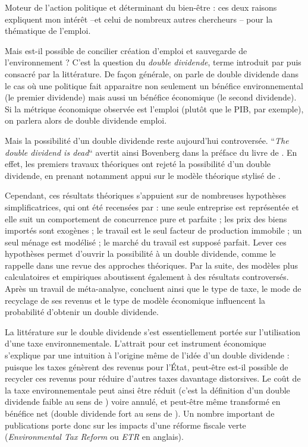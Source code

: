 Moteur de l'action politique et déterminant du bien-être : ces deux raisons expliquent mon intérêt --et celui de nombreux autres chercheurs -- pour la thématique de l'emploi.

Mais est-il possible de concilier création d'emploi et sauvegarde de l'environnement ? C'est la question du \textit{double dividende}, terme introduit par \citet{Pearce1991} puis consacré par la littérature. 
De façon générale, on parle de double dividende dans le cas où une politique fait apparaitre non seulement un bénéfice environnemental (le premier dividende) mais aussi un bénéfice économique (le second dividende). 
Si la métrique économique observée est l'emploi (plutôt que le PIB, par exemple), on parlera alors de double dividende emploi.

Mais la possibilité d'un double dividende reste aujourd'hui controversée. “\textit{The double dividend is dead}“ avertit ainsi Bovenberg dans la préface du livre de \citet{DeMooij2000}. En effet, les premiers travaux théoriques ont rejeté la possibilité d'un double dividende, en prenant notamment appui sur le modèle théorique stylisé de \citet{Bovenberg1994a}. 

Cependant, ces résultats théoriques s'appuient sur de nombreuses hypothèses simplificatrices, qui ont été recensées par \citet{Thubin2012} : une seule entreprise est représentée et elle suit un comportement de concurrence pure et parfaite ; les prix des biens importés sont exogènes ; le travail est le seul facteur de production immobile ; un seul ménage est modélisé ; le marché du travail est supposé parfait. 
Lever ces hypothèses permet d'ouvrir la possibilité à un double dividende, comme le rappelle \citet{Chiroleu-Assouline2001a} dans une revue des approches théoriques. Par la suite, des modèles plus calculatoires et empiriques aboutissent également à des résultats controversés. Après un travail de méta-analyse, \citet{Patuelli2005} concluent ainsi que le type de taxe, le mode de recyclage de ses revenus et le type de modèle économique influencent la probabilité d'obtenir un double dividende.

La littérature sur le double dividende s'est essentiellement portée sur l'utilisation d'une taxe environnementale. L'attrait pour cet instrument économique s'explique par une intuition à l'origine même de l'idée d'un double dividende : puisque les taxes génèrent des revenus pour l'État, peut-être est-il possible de recycler ces revenus pour réduire d'autres taxes davantage distorsives. Le coût de la taxe environnementale peut ainsi être réduit (c'est la définition d'un double dividende faible au sens de \citet{Goulder1994}) voire annulé, et peut-être même transformé en bénéfice net (double dividende fort au sens de \citet{Goulder1994}). Un nombre important de publications porte donc sur les impacts d'une réforme fiscale verte (\textit{Environmental Tax Reform} ou \textit{ETR} en anglais). 

